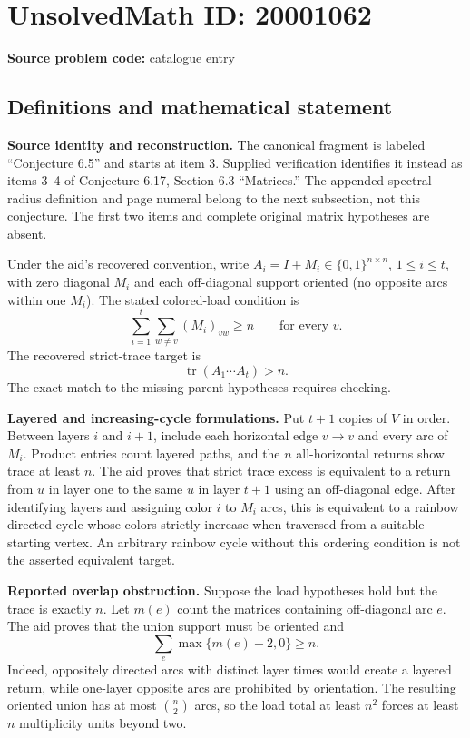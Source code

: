 \documentclass[11pt]{article}
\begin{document}
\section*{UnsolvedMath ID: 20001062}
\textbf{Source problem code:} catalogue entry
\subsection{Definitions and mathematical statement}
\textbf{Source identity and reconstruction.} The canonical fragment is labeled ``Conjecture 6.5'' and starts at item 3. Supplied verification identifies it instead as items 3--4 of Conjecture 6.17, Section 6.3 ``Matrices.'' The appended spectral-radius definition and page numeral belong to the next subsection, not this conjecture. The first two items and complete original matrix hypotheses are absent.

Under the aid's recovered convention, write $A_i=I+M_i\in\{0,1\}^{n\times n}$, $1\leq i\leq t$, with zero diagonal $M_i$ and each off-diagonal support oriented (no opposite arcs within one $M_i$). The stated colored-load condition is
\[
 \sum_{i=1}^t\sum_{w\ne v}(M_i)_{vw}\geq n\qquad\text{for every }v.
\]
The recovered strict-trace target is
\[
 \operatorname{tr}(A_1\cdots A_t)>n.
\]
The exact match to the missing parent hypotheses requires checking.

\textbf{Layered and increasing-cycle formulations.} Put $t+1$ copies of $V$ in order. Between layers $i$ and $i+1$, include each horizontal edge $v\to v$ and every arc of $M_i$. Product entries count layered paths, and the $n$ all-horizontal returns show trace at least $n$. The aid proves that strict trace excess is equivalent to a return from $u$ in layer one to the same $u$ in layer $t+1$ using an off-diagonal edge. After identifying layers and assigning color $i$ to $M_i$ arcs, this is equivalent to a rainbow directed cycle whose colors strictly increase when traversed from a suitable starting vertex. An arbitrary rainbow cycle without this ordering condition is not the asserted equivalent target.

\textbf{Reported overlap obstruction.} Suppose the load hypotheses hold but the trace is exactly $n$. Let $m(e)$ count the matrices containing off-diagonal arc $e$. The aid proves that the union support must be oriented and
\[
 \sum_e\max\{m(e)-2,0\}\geq n.
\]
Indeed, oppositely directed arcs with distinct layer times would create a layered return, while one-layer opposite arcs are prohibited by orientation. The resulting oriented union has at most $\binom n2$ arcs, so the load total at least $n^2$ forces at least $n$ multiplicity units beyond two.
\end{document}
